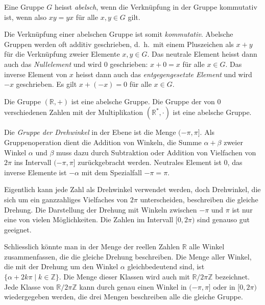 \begin{definition}[abelsch]
\label{buch:gruppen:definition:abelsch}
Eine Gruppe $G$ heisst {\em abelsch}, wenn 
%
die Verknüpfung in der Gruppe kommutativ ist, wenn also
$xy=yx$ für alle $x,y\in G$ gilt.
\end{definition}

Die Verknüpfung einer abelschen Gruppe ist somit {\em kommutativ}.
%
Abelsche Gruppen werden oft additiv geschrieben, d.~h.~mit einem
Pluszeichen als $x+y$ für die Verknüpfung zweier Elemente $x,y\in G$.
Das neutrale Element heisst dann auch das {\em Nullelement} und wird $0$
%
geschrieben: $x+0=x$ für alle $x\in G$.
Das inverse Element von $x$ heisst dann auch das
{\em entgegengesetzte Element} und wird $-x$ geschrieben. 
%
Es gilt $x+(-x)=0$ für alle $x\in G$.

\begin{beispiel}
Die Gruppe $(\mathbb{R},+)$ ist eine abelsche Gruppe.
Die Gruppe der von $0$ verschiedenen Zahlen mit der Multiplikation
$(\mathbb{R}^*,\cdot)$ ist eine abelsche Gruppe.
\end{beispiel}

\begin{beispiel}
Die {\em Gruppe der Drehwinkel} in der Ebene ist die Menge
$
(-\pi,\pi]
$.
Als Gruppenoperation dient die Addition von Winkeln, die Summe
$\alpha+\beta$ zweier Winkel $\alpha$ und $\beta$ muss dazu durch
Subtraktion oder Addition von Vielfachen von $2\pi$ ins Intervall
$(-\pi,\pi]$ zurückgebracht werden.
Neutrales Element ist $0$, das inverse Elemente ist $-\alpha$ mit
dem Spezialfall $-\pi=\pi$.

Eigentlich kann jede Zahl als Drehwinkel verwendet werden, doch
Drehwinkel, die sich um ein ganzzahliges Vielfaches von $2\pi$ unterscheiden,
beschreiben die gleiche Drehung.
Die Darstellung der Drehung mit Winkeln zwischen $-\pi$ und $\pi$ ist nur
eine von vielen Möglichkeiten.
Die Zahlen im Intervall $[0,2\pi)$ sind genauso gut geeignet.

Schliesslich könnte man in der Menge der reellen Zahlen $\mathbb{R}$
alle Winkel zusammenfassen, die die gleiche Drehung beschreiben.
Die Menge aller Winkel, die mit der Drehung um den Winkel $\alpha$
gleichbedeutend sind, ist $\{\alpha + 2k\pi\mid k\in\mathbb{Z}\}$.
Die Menge dieser Klassen wird auch mit $\mathbb{R}/2\pi\mathbb{Z}$
bezeichnet.
Jede Klasse von $\mathbb{R}/2\pi\mathbb{Z}$ kann durch genau einen
Winkel in $(-\pi,\pi]$ oder in $[0,2\pi)$ wiedergegeben werden,
die drei Mengen beschreiben alle die gleiche Gruppe.
\end{beispiel}

